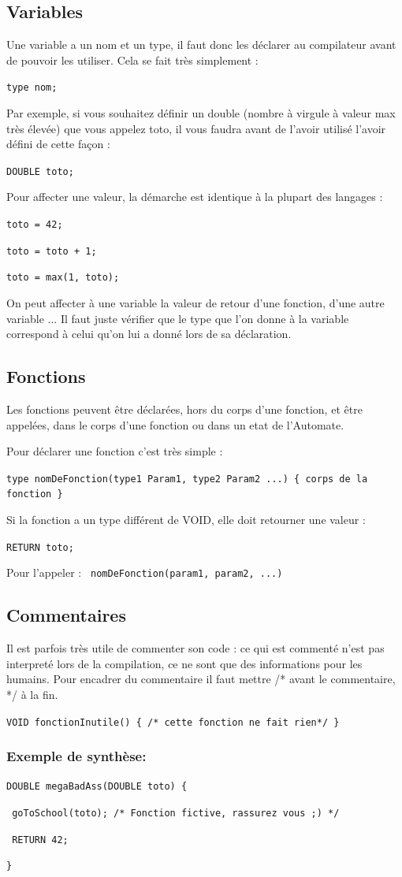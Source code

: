 \documentclass[a4paper,11pt]{report}
\begin{document}
\subsection{Variables}
Une variable a un nom et un type, il faut donc les déclarer au compilateur avant de pouvoir les utiliser. Cela se fait très simplement : 
\begin{center}
\texttt{type nom;}
\end{center}
Par exemple, si vous souhaitez définir un double (nombre à virgule à valeur max très élevée) que vous appelez toto, il vous faudra avant de l'avoir utilisé l'avoir défini de cette façon : 
\begin{center}
\texttt{DOUBLE toto;}
\end{center}
Pour affecter une valeur, la démarche est identique à la plupart des langages :
\begin{center}
	\texttt{toto = 42;}
	
	\texttt{toto = toto + 1;}
	
	\texttt{toto = max(1, toto);}
\end{center}
On peut affecter à une variable la valeur de retour d'une fonction, d'une autre variable ... Il faut juste vérifier que le type que l'on donne à la variable correspond à celui qu'on lui a donné lors de sa déclaration.

\subsection{Fonctions}
Les fonctions peuvent être déclarées, hors du corps d'une fonction, et être appelées, dans le corps d'une fonction ou dans un etat de l'Automate.

Pour déclarer une fonction c'est très simple : 
\begin{center}
\texttt{type nomDeFonction(type1 Param1, type2 Param2 ...) \{ corps de la fonction \}}
\end{center}

Si la fonction a un type différent de VOID, elle doit retourner une valeur : 
\begin{center}
\texttt{RETURN toto;}
\end{center}

Pour l'appeler : \texttt{ nomDeFonction(param1, param2, ...)}

\subsection{Commentaires}
Il est parfois très utile de commenter son code : ce qui est commenté n'est pas interpreté lors de la compilation, ce ne sont que des informations pour les humains.
Pour encadrer du commentaire il faut mettre /* avant le commentaire, */ à la fin.
\begin{center}
\texttt{VOID fonctionInutile() \{ /* cette fonction ne fait rien*/ \}}
\end{center}

\subsubsection{Exemple de synthèse:}

\texttt{DOUBLE megaBadAss(DOUBLE toto) \{}

\texttt{	goToSchool(toto); /* Fonction fictive, rassurez vous ;) */}

\texttt{	RETURN 42;}

\texttt{\}}
\end{document}
